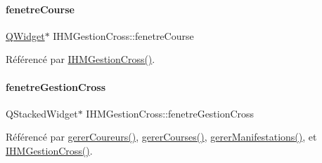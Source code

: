 \mbox{\label{class_i_h_m_gestion_cross_a939278dde9c1375400bbdd0b3b2476fc}} 
\paragraph{\texorpdfstring{fenetre\+Course}{fenetreCourse}}
{\footnotesize\ttfamily \hyperlink{class_q_widget}{Q\+Widget}$\ast$ I\+H\+M\+Gestion\+Cross\+::fenetre\+Course\hspace{0.3cm}{\ttfamily [private]}}



Référencé par \hyperlink{class_i_h_m_gestion_cross_a2c62fd83326a87456a403f46acc408c8}{I\+H\+M\+Gestion\+Cross()}.

\mbox{\label{class_i_h_m_gestion_cross_a2ae4807c25f35813507ff0a2abb2ffb3}} 
\paragraph{\texorpdfstring{fenetre\+Gestion\+Cross}{fenetreGestionCross}}
{\footnotesize\ttfamily Q\+Stacked\+Widget$\ast$ I\+H\+M\+Gestion\+Cross\+::fenetre\+Gestion\+Cross\hspace{0.3cm}{\ttfamily [private]}}



Référencé par \hyperlink{class_i_h_m_gestion_cross_ad46a2295500cf98dbc18f862f6020103}{gerer\+Coureurs()}, \hyperlink{class_i_h_m_gestion_cross_a82e3861f4959d3599d1d85ee0b3b8654}{gerer\+Courses()}, \hyperlink{class_i_h_m_gestion_cross_a406efb83dac8a8ac5d04e9b8cbeaf316}{gerer\+Manifestations()}, et \hyperlink{class_i_h_m_gestion_cross_a2c62fd83326a87456a403f46acc408c8}{I\+H\+M\+Gestion\+Cross()}.

\mbox{\label{class_i_h_m_gestion_cross_a0e1ed40bb375744135f70cb22d302b02}} 
